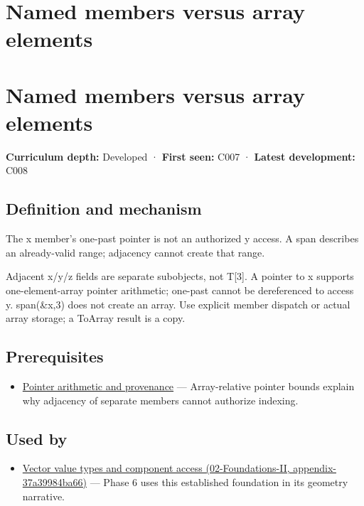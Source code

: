 \hypertarget{appendix-3f7e15effba6}{}
\section*{Named members versus array elements}
\section{Named members versus array elements}\label{named-members-versus-array-elements}

\textbf{Curriculum depth:} Developed · \textbf{First seen:} C007 · \textbf{Latest development:} C008

\subsection{Definition and mechanism}\label{definition-and-mechanism}

The x member's one-past pointer is not an authorized y access. A span describes an already-valid range; adjacency cannot create that range.

Adjacent x/y/z fields are separate subobjects, not T{[}3{]}. A pointer to x supports one-element-array pointer arithmetic; one-past cannot be dereferenced to access y. span(\&x,3) does not create an array. Use explicit member dispatch or actual array storage; a ToArray result is a copy.

\subsection{Prerequisites}\label{prerequisites}

\begin{itemize}
\tightlist
\item
  \hyperref[appendix-6af5921bc853]{Pointer arithmetic and provenance} --- Array-relative pointer bounds explain why adjacency of separate members cannot authorize indexing.
\end{itemize}

\subsection{Used by}\label{used-by}

\begin{itemize}
\tightlist
\item
  \href{}{Vector value types and component access (02-Foundations-II, appendix-37a39984ba66)} --- Phase 6 uses this established foundation in its geometry narrative.
\end{itemize}

